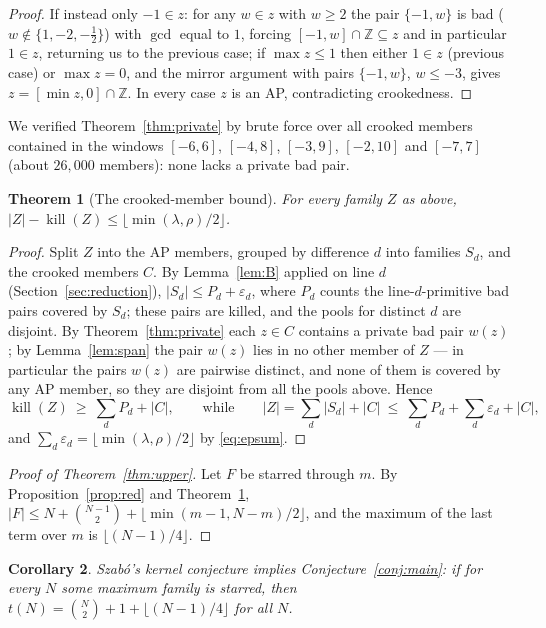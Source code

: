 \documentclass[11pt]{article}
\newtheorem{theorem}{Theorem}[section]
\newtheorem{corollary}[theorem]{Corollary}
\theoremstyle{definition}
\newcommand{\Z}{\mathbb{Z}}
\newcommand{\killop}{\operatorname{kill}}
\begin{document}
\begin{proof}
If instead only $-1\in z$: for any $w\in z$ with $w\ge 2$ the pair $\{-1,w\}$ is bad ($w\notin\{1,-2,-\tfrac12\}$) with $\gcd$ equal to $1$, forcing $[-1,w]\cap\Z\subseteq z$ and in particular $1\in z$, returning us to the previous case; if $\max z\le 1$ then either $1\in z$ (previous case) or $\max z=0$, and the mirror argument with pairs $\{-1,w\}$, $w\le-3$, gives $z=[\min z,0]\cap\Z$. In every case $z$ is an AP, contradicting crookedness.
\end{proof}

We verified Theorem~\ref{thm:private} by brute force over all crooked members contained in the windows $[-6,6]$, $[-4,8]$, $[-3,9]$, $[-2,10]$ and $[-7,7]$ (about $26{,}000$ members): none lacks a private bad pair.

\begin{theorem}[The crooked-member bound]\label{thm:lemA}
For every family $Z$ as above, $|Z|-\killop(Z)\le\lfloor\min(\lambda,\rho)/2\rfloor$.
\end{theorem}

\begin{proof}
Split $Z$ into the AP members, grouped by difference $d$ into families $S_d$, and the crooked members $C$. By Lemma~\ref{lem:B} applied on line $d$ (Section~\ref{sec:reduction}), $|S_d|\le P_d+\varepsilon_d$, where $P_d$ counts the line-$d$-primitive bad pairs covered by $S_d$; these pairs are killed, and the pools for distinct $d$ are disjoint. By Theorem~\ref{thm:private} each $z\in C$ contains a private bad pair $w(z)$; by Lemma~\ref{lem:span} the pair $w(z)$ lies in no other member of $Z$ --- in particular the pairs $w(z)$ are pairwise distinct, and none of them is covered by any AP member, so they are disjoint from all the pools above. Hence
\[ \killop(Z)\ \ge\ \sum_d P_d+|C|,\qquad\text{while}\qquad |Z|=\sum_d|S_d|+|C|\ \le\ \sum_d P_d+\sum_d\varepsilon_d+|C|, \]
and $\sum_d\varepsilon_d=\lfloor\min(\lambda,\rho)/2\rfloor$ by \eqref{eq:epsum}.
\end{proof}

\begin{proof}[Proof of Theorem~\ref{thm:upper}]
Let $F$ be starred through $m$. By Proposition~\ref{prop:red} and Theorem~\ref{thm:lemA}, $|F|\le N+\binom{N-1}2+\lfloor\min(m-1,N-m)/2\rfloor$, and the maximum of the last term over $m$ is $\lfloor(N-1)/4\rfloor$.
\end{proof}

\begin{corollary}\label{cor:kernel}
Szab\'o's kernel conjecture implies Conjecture~\ref{conj:main}: if for every $N$ some maximum family is starred, then $t(N)=\binom N2+1+\lfloor(N-1)/4\rfloor$ for all $N$.
\end{corollary}
\end{document}
